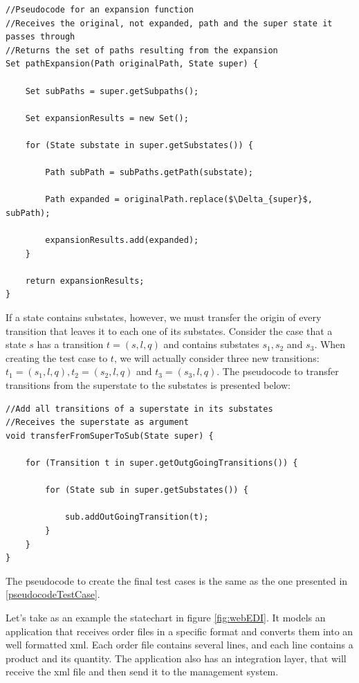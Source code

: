 \begin{lstlisting}[mathescape]
//Pseudocode for an expansion function
//Receives the original, not expanded, path and the super state it passes through
//Returns the set of paths resulting from the expansion
Set pathExpansion(Path originalPath, State super) {
		
	Set subPaths = super.getSubpaths();

	Set expansionResults = new Set();

	for (State substate in super.getSubstates()) {
		
		Path subPath = subPaths.getPath(substate);

		Path expanded = originalPath.replace($\Delta_{super}$, subPath);

		expansionResults.add(expanded);
	}

	return expansionResults;
}

\end{lstlisting}

If a state contains substates, however, we must transfer the origin of every transition that leaves it to each one of its substates. Consider the case that a state $s$ has a transition $t = (s,l,q)$ and contains substates $s_1, s_2$ and $s_3$. When creating the test case to $t$, we will actually consider three new transitions: $t_1 = (s_1,l,q), t_2 = (s_2,l,q)$ and $t_3 = (s_3,l,q)$. The pseudocode to transfer transitions from the superstate to the substates is presented below:

\begin{lstlisting}
//Add all transitions of a superstate in its substates
//Receives the superstate as argument
void transferFromSuperToSub(State super) {
	
	for (Transition t in super.getOutgGoingTransitions()) {
		
		for (State sub in super.getSubstates()) {
			
			sub.addOutGoingTransition(t);
		}
	}
}

\end{lstlisting}

The pseudocode to create the final test cases is the same as the one presented in \ref{pseudocodeTestCase}.

Let's take as an example the statechart in figure \ref{fig:webEDI}. It models an application that receives order files in a specific format and converts them into an well formatted xml. Each order file contains several lines, and each line contains a product and its quantity. The application also has an integration layer, that will receive the xml file and then send it to the management system.

